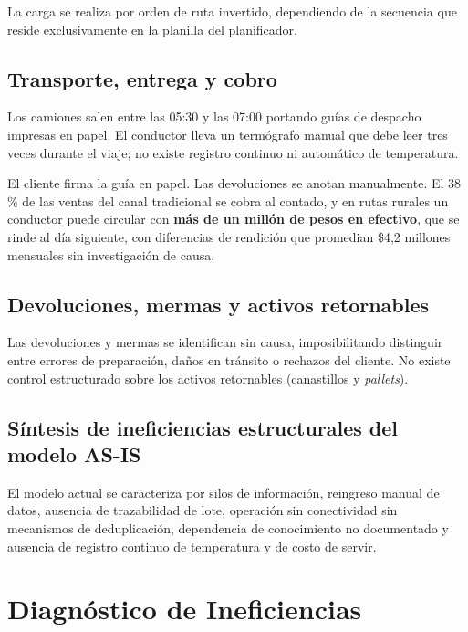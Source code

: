La carga se realiza por orden de ruta invertido, dependiendo de la secuencia que reside
exclusivamente en la planilla del planificador.

\subsection{Transporte, entrega y cobro}

Los camiones salen entre las 05:30 y las 07:00 portando guías de despacho impresas en
papel. El conductor lleva un termógrafo manual que debe leer tres veces durante el viaje;
no existe registro continuo ni automático de temperatura.

El cliente firma la guía en papel. Las devoluciones se anotan manualmente. El 38\,\% de
las ventas del canal tradicional se cobra al contado, y en rutas rurales un conductor
puede circular con \textbf{más de un millón de pesos en efectivo}, que se rinde al día
siguiente, con diferencias de rendición que promedian \$4,2 millones mensuales sin
investigación de causa.

\subsection{Devoluciones, mermas y activos retornables}

Las devoluciones y mermas se identifican sin causa, imposibilitando distinguir entre
errores de preparación, daños en tránsito o rechazos del cliente. No existe control
estructurado sobre los activos retornables (canastillos y \emph{pallets}).

\subsection{Síntesis de ineficiencias estructurales del modelo AS-IS}

El modelo actual se caracteriza por silos de información, reingreso manual de datos,
ausencia de trazabilidad de lote, operación sin conectividad sin mecanismos de
deduplicación, dependencia de conocimiento no documentado y ausencia de registro continuo
de temperatura y de costo de servir.



\section{Diagnóstico de Ineficiencias}

